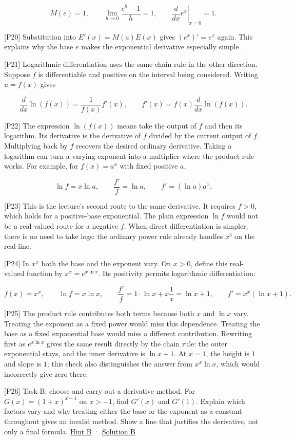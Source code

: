 \documentclass[
  11pt,
]{article}
\providecommand{\gt}{>}
\begin{document}
\[
M(e)=1,\qquad
\lim_{h\to0}\frac{e^h-1}{h}=1,\qquad
\left.\frac{d}{dx}e^x\right|_{x=0}=1.
\]

{[}P20{]} Substitution into \(E'(x)=M(a)E(x)\) gives \((e^x)'=e^x\)
again. This explains why the base \(e\) makes the exponential derivative
especially simple.

{[}P21{]} Logarithmic differentiation uses the same chain rule in the
other direction. Suppose \(f\) is differentiable and positive on the
interval being considered. Writing \(u=f(x)\) gives

\[
\frac{d}{dx}\ln(f(x))=\frac1{f(x)}f'(x),
\qquad f'(x)=f(x)\frac{d}{dx}\ln(f(x)).
\]

{[}P22{]} The expression \(\ln(f(x))\) means take the output of \(f\)
and then its logarithm. Its derivative is the derivative of \(f\)
divided by the current output of \(f\). Multiplying back by \(f\)
recovers the desired ordinary derivative. Taking a logarithm can turn a
varying exponent into a multiplier where the product rule works. For
example, for \(f(x)=a^x\) with fixed positive \(a\),

\[
\ln f=x\ln a,\qquad
\frac{f'}f=\ln a,\qquad f'=(\ln a)a^x.
\]

{[}P23{]} This is the lecture's second route to the same derivative. It
requires \(f\gt0\), which holds for a positive-base exponential. The
plain expression \(\ln f\) would not be a real-valued route for a
negative \(f\). When direct differentiation is simpler, there is no need
to take logs: the ordinary power rule already handles \(x^3\) on the
real line.

{[}P24{]} In \(x^x\) both the base and the exponent vary. On \(x\gt0\),
define this real-valued function by \(x^x=e^{x\ln x}\). Its positivity
permits logarithmic differentiation:

\[
f(x)=x^x,\qquad \ln f=x\ln x,
\qquad \frac{f'}f=1\cdot\ln x+x\frac1x=\ln x+1,
\qquad f'=x^x(\ln x+1).
\]

{[}P25{]} The product rule contributes both terms because both \(x\) and
\(\ln x\) vary. Treating the exponent as a fixed power would miss this
dependence. Treating the base as a fixed exponential base would miss a
different contribution. Rewriting first as \(e^{x\ln x}\) gives the same
result directly by the chain rule: the outer exponential stays, and the
inner derivative is \(\ln x+1\). At \(x=1\), the height is \(1\) and
slope is \(1\); this check also distinguishes the answer from
\(x^x\ln x\), which would incorrectly give zero there.

{[}P26{]} Task B: choose and carry out a derivative method. For
\(G(x)=(1+x)^{x-1}\) on \(x\gt-1\), find \(G'(x)\) and \(G'(1)\).
Explain which factors vary and why treating either the base or the
exponent as a constant throughout gives an invalid method. Show a line
that justifies the derivative, not only a final formula.
\protect\hyperlink{hint-b}{Hint B} ·
\protect\hyperlink{solution-b}{Solution B}
\end{document}
